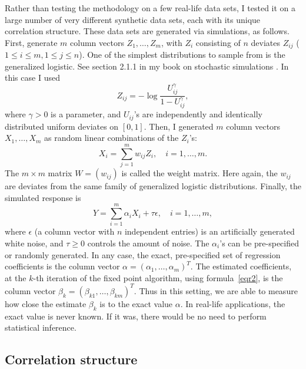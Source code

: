 \documentclass[oneside,10pt]{book}
\begin{document}
Rather than testing the methodology on a few real-life data sets, I tested it on a large number of very different synthetic data sets, each with its unique correlation structure. These data sets are generated via simulations, as follows. First, generate $m$ column vectors $Z_1,\dots,Z_m$, with $Z_i$ consisting of $n$ deviates $Z_{ij}$ ($1\leq i \leq m, 1\leq j \leq n$). One of the simplest distributions to sample from is the \textcolor{index}{generalized logistic}. See section 2.1.1 in my book on
stochastic simulations \cite{vgsimulnew}. In this case I used
$$Z_{ij}= -\log \frac{U_{ij}^\gamma}{1-U_{ij}^\gamma},$$
where $\gamma>0$ is a parameter, and $U_{ij}$'s are independently and identically distributed uniform deviates on $[0,1]$.
Then, I generated $m$ column vectors $X_1,\dots,X_m$ as random linear combinations of the $Z_i$'s:
\begin{equation}
X_i=\sum_{j=1}^m w_{ij} Z_i,\quad i=1,\dots,m.\label{regwij}
\end{equation}
The $m \times m$ matrix $W=(w_{ij})$ is called the weight matrix. Here again, the $w_{ij}$ are deviates from the same family of generalized logistic distributions. Finally, the simulated response is
$$Y=\sum_{i=1}^m \alpha_i X_i + \tau \epsilon, \quad i=1,\dots,m,$$
where $\epsilon$ (a column vector with $n$ independent entries) is an artificially generated white noise, and $\tau\geq 0$ controls the amount of noise.
The $\alpha_i$'s can be pre-specified or randomly generated. In any case, the exact,
pre-specified set of regression coefficients is the column vector $\alpha=(\alpha_1,\dots,\alpha_m)^T$. The estimated coefficients, at the $k$-th iteration of the fixed point algorithm, using formula~\ref{eqr2}, is the column vector $\beta_k=(\beta_{k1},\dots,\beta_{km})^T$. Thus in this setting, we are able to measure how close the estimate $\beta_k$ is to the exact value $\alpha$. In real-life applications, the exact value is never known. If it was, there would be no need to perform statistical inference.

\subsection{Correlation structure}\label{c6correlstr}
\end{document}
